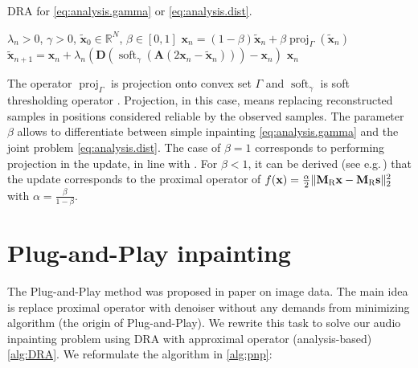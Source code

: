 \documentclass[conference]{IEEEtran}
\newcommand{\todo}[1]{\textcolor{red}{#1}}
\begin{document}
\begin{algorithm}
	\caption{DRA for \eqref{eq:analysis.gamma} or \eqref{eq:analysis.dist}.}
	\begin{algorithmic}[1]\label{alg:DRA}
		\renewcommand{\algorithmicrequire}{\textbf{Input:}}
		\renewcommand{\algorithmicensure}{\textbf{Output:}}
		\REQUIRE $ \lambda_n > 0 $, $ \gamma>0 $, $ \mathbf{\widetilde{x}}_0 \in \mathbb{R}^{N} $, $\beta \in [0, 1]$
		\STATE $\mathbf{x}_n= (1-\beta)\mathbf{\widetilde{x}}_n + \beta \operatorname{proj}_{\Gamma}(\mathbf{\widetilde{x}}_n) $ 
		\STATE $ \mathbf{\widetilde{x}}_{n+1} = \mathbf{x}_n + \lambda_n \left( \mathbf{D}\left(\operatorname{soft}_{\gamma}\left(\mathbf{A}\left(2\mathbf{x}_n-\mathbf{\widetilde{x}}_n\right) \right)\right) -\mathbf{x}_n\right)$
		\ENDFOR
		\RETURN $\mathbf{x}_n$ %
	\end{algorithmic} 
\end{algorithm}

The operator $ \operatorname{proj}_{\Gamma}$ is projection onto convex set $ \Gamma $ and $\operatorname{soft}_{\gamma}$ is soft thresholding operator \cite{Combettes2011}.
Projection, in this case, means replacing reconstructed samples in positions considered reliable by the observed samples.
The parameter $\beta$ allows to differentiate between simple inpainting \eqref{eq:analysis.gamma} and the joint problem \eqref{eq:analysis.dist}.
The case of $\beta = 1$ corresponds to performing projection in the update, in line with \cite{Mokry2020}.
For $\beta < 1$, it can be derived (see e.g.\,\cite[Sec.\,4 and Tab.\,1]{Combettes2011}) that the update corresponds to the proximal operator of $f(\mathbf{x}) = \frac{\alpha}{2} \Vert \mathbf{M}_{\textup{R}} \mathbf {x} - \mathbf{M}_{\textup{R}} \mathbf{s} \Vert^2_2$ with $\alpha = \frac{\beta}{1-\beta}$.


\section{Plug-and-Play inpainting} \label{sec:plugaandplay}

The Plug-and-Play method was proposed in paper \cite{Chan2016} on image data.
The main idea is replace proximal operator with denoiser without any demands from minimizing algorithm (the origin of Plug-and-Play).
We rewrite this task to solve our audio inpainting problem using DRA with approximal operator (analysis-based) \ref{alg:DRA}.
We reformulate the algorithm in \ref{alg:pnp}:
\end{document}
